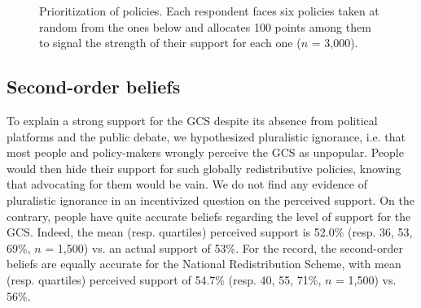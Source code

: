 \begin{figure}
  \caption{Prioritization of policies. Each respondent faces six policies taken at random from the ones below and allocates 100 points among them to signal the strength of their support for each one ($n$ = 3,000).} %
  
  \label{fig:points}
\end{figure}


\subsection{Second-order beliefs}
To explain a strong support for the GCS despite its absence from political platforms and the public debate, we hypothesized pluralistic ignorance, i.e. that most people and policy-makers wrongly perceive the GCS as unpopular. People would then hide their support for such globally redistributive policies, knowing that advocating for them would be vain. We do not find any evidence of pluralistic ignorance in an incentivized question on the perceived support. On the contrary, people have quite accurate beliefs regarding the level of support for the GCS. Indeed, the mean (resp. quartiles) perceived support is 52.0\% (resp. 36, 53, 69\%, $n$ = 1,500) vs. an actual support of 53\%. For the record, the second-order beliefs are equally accurate for the National Redistribution Scheme, with mean (resp. quartiles) perceived support of 54.7\% (resp. 40, 55, 71\%, $n$ = 1,500) vs. 56\%.

